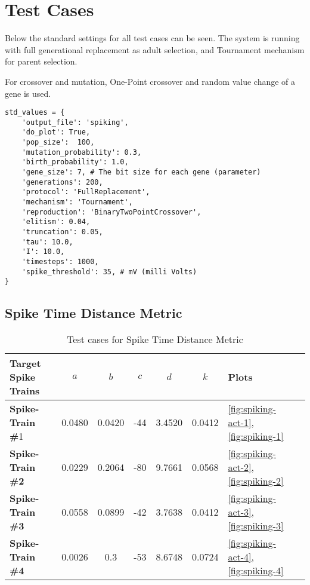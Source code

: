 \section{Test Cases}


Below the standard settings for all test cases can be seen. The system is running
with full generational replacement as adult selection, and Tournament mechanism for
parent selection.

For crossover and mutation, One-Point crossover and random value change of a gene is used. 

\begin{lstlisting}[frame=single,caption={Default values for all params}] 
std_values = {
    'output_file': 'spiking',
    'do_plot': True,
    'pop_size':  100,
    'mutation_probability': 0.3,
    'birth_probability': 1.0,
    'gene_size': 7, # The bit size for each gene (parameter)
    'generations': 200,
    'protocol': 'FullReplacement',
    'mechanism': 'Tournament',
    'reproduction': 'BinaryTwoPointCrossover',
    'elitism': 0.04,
    'truncation': 0.05,
    'tau': 10.0,
    'I': 10.0,
    'timesteps': 1000,
    'spike_threshold': 35, # mV (milli Volts)
}
\end{lstlisting}

\subsection{Spike Time Distance Metric}

\begin{table}[H]
	\begin{center}
		\begin{tabular}{ | l | c | c | c | c | c | l | l |}
	
	    \hline

			\textbf{Target Spike Trains} & \textbf{$a$} & \textbf{$b$} & \textbf{$c$} & \textbf{$d$} & \textbf{$k$} & \textbf{Plots}  \\ \hline 
			\textbf{Spike-Train \#}1 & 0.0480 & 0.0420 & -44 & 3.4520 & 0.0412 & \autoref{fig:spiking-act-1}, \autoref{fig:spiking-1} \\ \hline 
			\textbf{Spike-Train \#2} & 0.0229 & 0.2064 & -80 & 9.7661 & 0.0568 & \autoref{fig:spiking-act-2}, \autoref{fig:spiking-2} \\ \hline 
			\textbf{Spike-Train \#3} & 0.0558 & 0.0899 & -42 & 3.7638 & 0.0412 & \autoref{fig:spiking-act-3}, \autoref{fig:spiking-3} \\ \hline 
			\textbf{Spike-Train \#4} & 0.0026 & 0.3 & -53 & 8.6748 & 0.0724 & \autoref{fig:spiking-act-4}, \autoref{fig:spiking-4}    \\ \hline 

	    \end{tabular}
	
	\end{center}
    \caption{Test cases for Spike Time Distance Metric}
\end{table}

